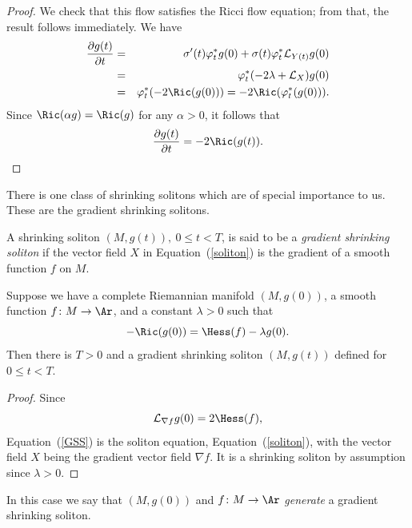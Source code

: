 \begin{proof}
We check that this flow satisfies the Ricci flow equation; from
that, the result follows immediately. We have
\begin{eqnarray*} \frac{\partial g(t)}{\partial t} & = &
\sigma'(t)\varphi_t^*g(0)+\sigma(t)\varphi_t^*{\mathcal L}_{Y(t)}g(0)\\
& = & \varphi_t^*(-2\lambda+{\mathcal L}_X)g(0)\\
& = & \varphi_t^*(-2\Ric(g(0))) =-2\Ric(\varphi_t^*(g(0))).
\end{eqnarray*}
Since $\Ric(\alpha g)=\Ric(g)$ for any $\alpha>0$, it follows that
$$\frac{\partial g(t)}{\partial t} = -2\Ric(g(t)).$$
\end{proof}



There is one class of shrinking solitons which are of special
importance to us. These are the gradient shrinking solitons.

\begin{definition}\label{def:gradient-shrinking-soliton}
A shrinking soliton $(M,g(t)),\ 0\le t<T$, is said to be a {\em
gradient shrinking soliton} if
the vector field $X$ in Equation~(\ref{soliton}) is the gradient of
a smooth function $f$ on $M$.
\end{definition}

\begin{proposition}\label{prop:gradient-shrinking-soliton-generation}
\label{GSSgeneration}
 Suppose we have a complete Riemannian manifold $(M,g(0))$, a
smooth function $f\colon M\to \Ar$, and a constant $\lambda>0$ such
that
\begin{equation}\label{GSS}
-\Ric(g(0))=\Hess(f)-\lambda g(0). \end{equation}
 Then there is $T>0$ and a gradient shrinking soliton
$(M,g(t))$ defined for  $0\le t<T.$ \end{proposition}

\begin{proof}
Since
$${\mathcal L}_{\nabla f}g(0)=2\Hess(f),$$
 Equation~(\ref{GSS}) is the soliton equation,
Equation~(\ref{soliton}), with the vector field $X$ being the
gradient vector field $\nabla f$. It is a shrinking soliton by
assumption since $\lambda>0$.
\end{proof}

\begin{definition}\label{def:gradient-shrinking-soliton-generator}
In this case we say that $(M,g(0))$ and $f\colon M\to \Ar$ {\em
generate} a gradient shrinking soliton.
\end{definition}


